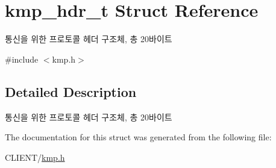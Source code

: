\hypertarget{structkmp__hdr__t}{\section{kmp\-\_\-hdr\-\_\-t Struct Reference}
\label{structkmp__hdr__t}
}


통신을 위한 프로토콜 헤더 구조체, 총 20바이트  




{\ttfamily \#include $<$kmp.\-h$>$}



\subsection{Detailed Description}
통신을 위한 프로토콜 헤더 구조체, 총 20바이트 

The documentation for this struct was generated from the following file\-:\begin{DoxyCompactItemize}
\item 
C\-L\-I\-E\-N\-T/\hyperlink{kmp_8h}{kmp.\-h}\end{DoxyCompactItemize}
